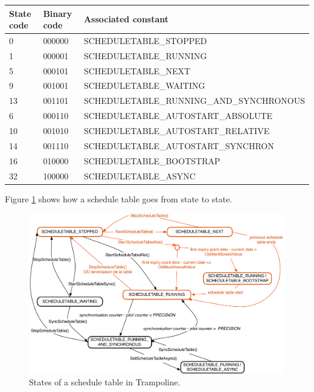 \begin{table}[H]
\begin{center}
\caption{\textcolor{white}{q}States of a schedule table } %
\begin{longtable}[c]{l|l|l}
{\bf State code}&{\bf Binary code}&{\bf Associated constant}\\
\hline
0 & 000000 & SCHEDULETABLE_STOPPED \\
1 & 000001 & SCHEDULETABLE_RUNNING \\
5 & 000101 & SCHEDULETABLE_NEXT \\
9 & 001001 & SCHEDULETABLE_WAITING \\
13 & 001101 & SCHEDULETABLE_RUNNING_AND_SYNCHRONOUS \\
\hline
6 & 000110 & SCHEDULETABLE_AUTOSTART_ABSOLUTE \\
10 & 001010 & SCHEDULETABLE_AUTOSTART_RELATIVE \\
14 & 001110 & SCHEDULETABLE_AUTOSTART_SYNCHRON \\
\hline
16 & 010000 & SCHEDULETABLE_BOOTSTRAP \\
32 & 100000 & SCHEDULETABLE_ASYNC \\ 
\end{longtable} 
\end{center}
\label{schedtablestates}
\end{table}

Figure \ref{fig:STstates} shows how a schedule table goes from state to state.

\begin{figure}[H] %
   \centering
   \includegraphics[scale=0.6]{pictures/STstates.pdf}  
   \caption{States of a schedule table in Trampoline.}
   \label{fig:STstates}
\end{figure} 
	
